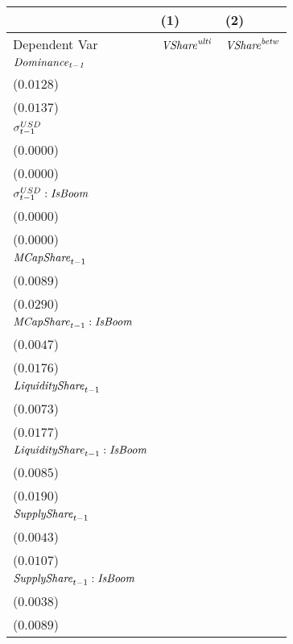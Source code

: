 \begin{tabular}{lll}
\toprule
{} &                                       (1) &                                       (2) \\
\midrule
Dependent Var                             &                 ${\it VShare}^{\it ulti}$ &                 ${\it VShare}^{\it betw}$ \\
$\it Dominance_{t-1}$                     &   \makecell{$0.8681^{***}$ \\ ($0.0128$)} &   \makecell{$0.8704^{***}$ \\ ($0.0137$)} \\
${\it \sigma}^{USD}_{t-1}$                &    \makecell{$-0.0000^{*}$ \\ ($0.0000$)} &   \makecell{$0.0000^{***}$ \\ ($0.0000$)} \\
${\it \sigma}^{USD}_{t-1}:{\it IsBoom}$   &   \makecell{$0.0000^{***}$ \\ ($0.0000$)} &  \makecell{$-0.0000^{***}$ \\ ($0.0000$)} \\
${\it MCapShare}_{t-1}$                   &      \makecell{$0.0113^{}$ \\ ($0.0089$)} &     \makecell{$-0.0031^{}$ \\ ($0.0290$)} \\
${\it MCapShare}_{t-1}:{\it IsBoom}$      &     \makecell{$-0.0003^{}$ \\ ($0.0047$)} &   \makecell{$0.0828^{***}$ \\ ($0.0176$)} \\
${\it LiquidityShare}_{t-1}$              &   \makecell{$0.0480^{***}$ \\ ($0.0073$)} &   \makecell{$0.1099^{***}$ \\ ($0.0177$)} \\
${\it LiquidityShare}_{t-1}:{\it IsBoom}$ &     \makecell{$-0.0012^{}$ \\ ($0.0085$)} &     \makecell{$-0.0020^{}$ \\ ($0.0190$)} \\
${\it SupplyShare}_{t-1}$                 &   \makecell{$0.0195^{***}$ \\ ($0.0043$)} &   \makecell{$0.0428^{***}$ \\ ($0.0107$)} \\
${\it SupplyShare}_{t-1}:{\it IsBoom}$    &    \makecell{$-0.0069^{*}$ \\ ($0.0038$)} &   \makecell{$-0.0198^{**}$ \\ ($0.0089$)} \\

\end{tabular}
